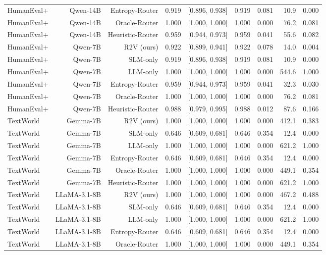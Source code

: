 \begin{table}[t]
\begin{tabular}{lrrrrrrrr}
HumanEval+ & Qwen-14B & Entropy-Router & 0.919 & [0.896, 0.938] & 0.919 & 0.081 & 10.9 & 0.000 \\
HumanEval+ & Qwen-14B & Oracle-Router & 1.000 & [1.000, 1.000] & 1.000 & 0.000 & 76.2 & 0.081 \\
HumanEval+ & Qwen-14B & Heuristic-Router & 0.959 & [0.944, 0.973] & 0.959 & 0.041 & 55.6 & 0.082 \\
HumanEval+ & Qwen-7B & R2V (ours) & 0.922 & [0.899, 0.941] & 0.922 & 0.078 & 14.0 & 0.004 \\
HumanEval+ & Qwen-7B & SLM-only & 0.919 & [0.896, 0.938] & 0.919 & 0.081 & 10.9 & 0.000 \\
HumanEval+ & Qwen-7B & LLM-only & 1.000 & [1.000, 1.000] & 1.000 & 0.000 & 544.6 & 1.000 \\
HumanEval+ & Qwen-7B & Entropy-Router & 0.959 & [0.944, 0.973] & 0.959 & 0.041 & 32.3 & 0.030 \\
HumanEval+ & Qwen-7B & Oracle-Router & 1.000 & [1.000, 1.000] & 1.000 & 0.000 & 76.2 & 0.081 \\
HumanEval+ & Qwen-7B & Heuristic-Router & 0.988 & [0.979, 0.995] & 0.988 & 0.012 & 87.6 & 0.166 \\
TextWorld & Gemma-7B & R2V (ours) & 1.000 & [1.000, 1.000] & 1.000 & 0.000 & 412.1 & 0.383 \\
TextWorld & Gemma-7B & SLM-only & 0.646 & [0.609, 0.681] & 0.646 & 0.354 & 12.4 & 0.000 \\
TextWorld & Gemma-7B & LLM-only & 1.000 & [1.000, 1.000] & 1.000 & 0.000 & 621.2 & 1.000 \\
TextWorld & Gemma-7B & Entropy-Router & 0.646 & [0.609, 0.681] & 0.646 & 0.354 & 12.4 & 0.000 \\
TextWorld & Gemma-7B & Oracle-Router & 1.000 & [1.000, 1.000] & 1.000 & 0.000 & 449.1 & 0.354 \\
TextWorld & Gemma-7B & Heuristic-Router & 1.000 & [1.000, 1.000] & 1.000 & 0.000 & 621.2 & 1.000 \\
TextWorld & LLaMA-3.1-8B & R2V (ours) & 1.000 & [1.000, 1.000] & 1.000 & 0.000 & 467.2 & 0.488 \\
TextWorld & LLaMA-3.1-8B & SLM-only & 0.646 & [0.609, 0.681] & 0.646 & 0.354 & 12.4 & 0.000 \\
TextWorld & LLaMA-3.1-8B & LLM-only & 1.000 & [1.000, 1.000] & 1.000 & 0.000 & 621.2 & 1.000 \\
TextWorld & LLaMA-3.1-8B & Entropy-Router & 0.646 & [0.609, 0.681] & 0.646 & 0.354 & 12.4 & 0.000 \\
TextWorld & LLaMA-3.1-8B & Oracle-Router & 1.000 & [1.000, 1.000] & 1.000 & 0.000 & 449.1 & 0.354 \\

\end{tabular}
\end{table}
